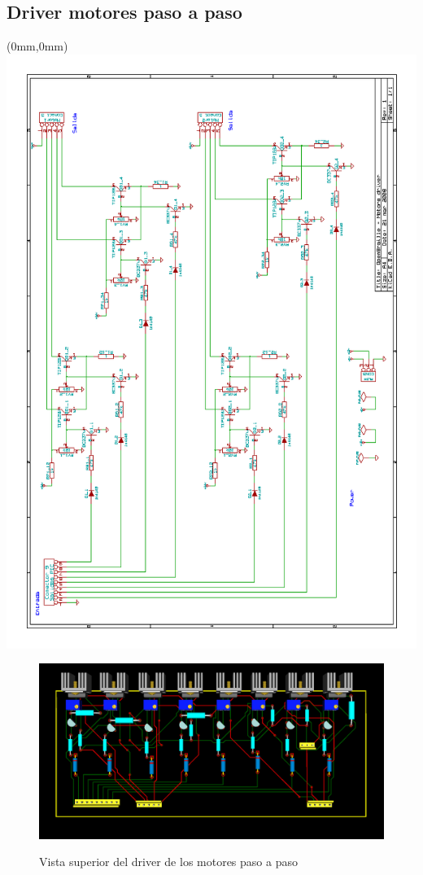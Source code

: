 \subsection{Driver motores paso a paso}
\newpage
\clearpage
\begin{textblock*}{297mm}(0mm,0mm)
   \includegraphics[width=\paperwidth]{./img/driver.png}
   \label{cap:driver_schema}
\end{textblock*}
\pagebreak
\cleardoublepage


\begin{figure}[htp]
  \centering
  \includegraphics[width=14cm]{./img/driver_3d_1.png}
  \label{fig:driver_3d_1}
  \caption{Vista superior del driver de los motores paso a paso}
\end{figure}

